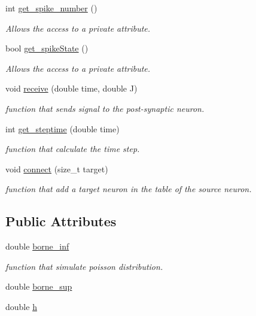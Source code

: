 \begin{DoxyCompactItemize}
int \hyperlink{classNeuron_a901a5dcb2cdf6b624d8b6b515b66ad7d}{get\-\_\-spike\-\_\-number} ()
\begin{DoxyCompactList}\small\item\em Allows the access to a private attribute. \end{DoxyCompactList}\item 
bool \hyperlink{classNeuron_a8bce8864e5fcd328585f01db61e93e71}{get\-\_\-spike\-State} ()
\begin{DoxyCompactList}\small\item\em Allows the access to a private attribute. \end{DoxyCompactList}\item 
void \hyperlink{classNeuron_ac29c1805fb20f82d8d660aa71984c8af}{receive} (double time, double J)
\begin{DoxyCompactList}\small\item\em function that sends signal to the post-\/synaptic neuron. \end{DoxyCompactList}\item 
int \hyperlink{classNeuron_a23f6157b3d03d699414de8c6e1f3312c}{get\-\_\-steptime} (double time)
\begin{DoxyCompactList}\small\item\em function that calculate the time step. \end{DoxyCompactList}\item 
void \hyperlink{classNeuron_aea177be15705611f01e31fbef4a2beb3}{connect} (size\-\_\-t target)
\begin{DoxyCompactList}\small\item\em function that add a target neuron in the table of the source neuron. \end{DoxyCompactList}\end{DoxyCompactItemize}
\subsection*{Public Attributes}
\begin{DoxyCompactItemize}
\item 
double \hyperlink{classNeuron_ae90ea57c6d9559c8adeb5c46ee6778e1}{borne\-\_\-inf}
\begin{DoxyCompactList}\small\item\em function that simulate poisson distribution. \end{DoxyCompactList}\item 
double \hyperlink{classNeuron_af8db865bd7e1f841035fbd99c821dbed}{borne\-\_\-sup}
\item 
double \hyperlink{classNeuron_ae540cc540666b20457f914d7116eea24}{h}
\end{DoxyCompactItemize}



